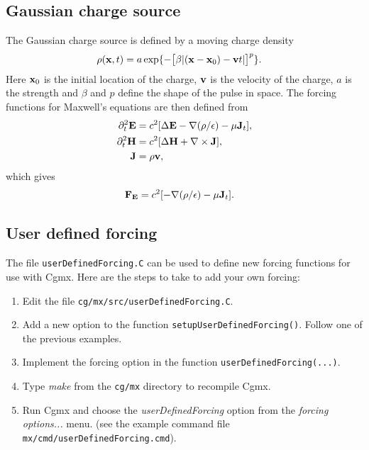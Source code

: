 \documentclass{article}
\begin{document}
\subsection{Gaussian charge source} \label{sec:gaussianChargeSource}

The Gaussian charge source is defined by a moving charge density 
\begin{align}
  \rho(\mathbf{ x},t) &= a \exp\{ - \big[\beta| (\mathbf{ x}-\mathbf{ x}_0) - \mathbf{ v} t |\big]^p \}.
\end{align}
Here $\mathbf{ x}_0$ is the initial location of the charge, $\mathbf{ v}$ is the velocity of the charge, $a$ is the strength and $\beta$ and $p$ define the
shape of the pulse in space.
The forcing functions for Maxwell's equations are then defined from
\begin{align}
    \partial_t^2 \mathbf{ E} &= c^2 [ \Delta \mathbf{ E} - \nabla(\rho/\epsilon) - \mu \mathbf{ J}_t ], \\
    \partial_t^2 \mathbf{ H} &= c^2 [ \Delta \mathbf{ H} + \nabla\times\mathbf{ J} ], \\
     \mathbf{ J} & = \rho \mathbf{ v} ,
\end{align}
which gives 
\begin{align}
   \mathbf{ F}_{\mathbf{ E}} &= c^2 [  - \nabla(\rho/\epsilon) - \mu \mathbf{ J}_t ].
\end{align}

\subsection{User defined forcing} \label{sec:userDefinedForcing}



The file {\tt userDefinedForcing.C} can be used to define new forcing functions
for use with Cgmx. Here are the steps to take to add your own forcing:
\begin{enumerate}
  \item Edit the file  {\tt cg/mx/src/userDefinedForcing.C}.
  \item Add a new option to the function {\tt setupUserDefinedForcing()}. Follow one of the previous
         examples. 
  \item Implement the forcing option in the function {\tt userDefinedForcing(...)}.
  \item Type {\em make} from the {\tt cg/mx} directory to recompile Cgmx.
  \item Run Cgmx and choose the {\em userDefinedForcing} option from the {\em forcing options...} menu.
    (see the example command file {\tt mx/cmd/userDefinedForcing.cmd}).
\end{enumerate}
\end{document}
